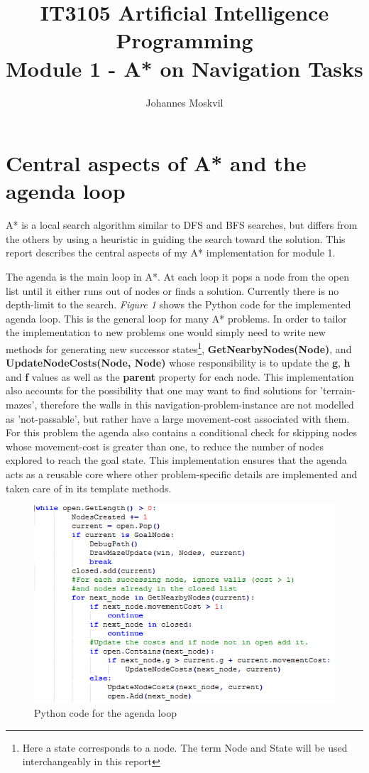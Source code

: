 \documentclass[11pt]{article}
\title{IT3105 Artificial Intelligence Programming \\ Module 1 - A* on Navigation Tasks}
\author{Johannes Moskvil}
\begin{document}
\maketitle

\section*{Central aspects of A* and the agenda loop}
A* is a local search algorithm similar to DFS and BFS searches, but differs from the others by using a heuristic in guiding the search toward the solution. This report describes the central aspects of my A* implementation for module 1.

\vspace{5mm}

The agenda is the main loop in A*. At each loop it pops a node from the open list until it either runs out of nodes or finds a solution. Currently there is no depth-limit to the search. \textit{Figure 1} shows the Python code for the implemented agenda loop. This is the general loop for many A* problems. In order to tailor the implementation to new problems one would simply need to write new methods for generating new successor states\footnote{Here a state corresponds to a node. The term Node and State will be used interchangeably in this report}, \textbf{GetNearbyNodes(Node)}, and \textbf{UpdateNodeCosts(Node, Node)} whose responsibility is to update the \textbf{g}, \textbf{h} and \textbf{f} values as well as the \textbf{parent} property for each node. 
This implementation also accounts for the possibility that one may want to find solutions for 'terrain-mazes', therefore the walls in this navigation-problem-instance are not modelled as 'not-passable', but rather have a large movement-cost associated with them. For this problem the agenda also contains a conditional check for skipping nodes whose movement-cost is greater than one, to reduce the number of nodes explored to reach the goal state. This implementation ensures that the agenda acts as a reusable core where other problem-specific details are implemented and taken care of in its template methods.

\begin{figure}[h]
\centerline{\includegraphics[scale=0.9]{Agenda_loop.png}}
\caption{Python code for the agenda loop}
\end{figure}
\end{document}
